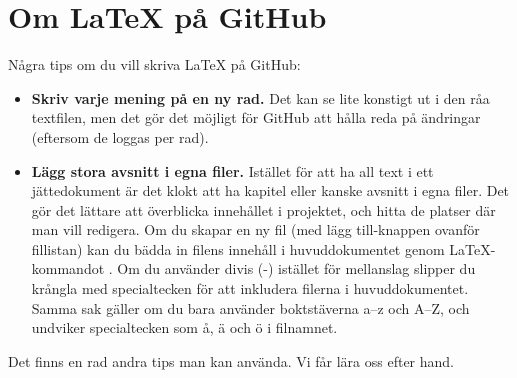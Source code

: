 \section{Om LaTeX på GitHub}

Några tips om du vill skriva LaTeX på GitHub:

\begin{itemize}

\item \textbf{Skriv varje mening på en ny rad.}
Det kan se lite konstigt ut i den råa textfilen, men det gör det möjligt för GitHub att hålla reda på ändringar (eftersom de loggas per rad).
\item \textbf{Lägg stora avsnitt i egna filer.}
Istället för att ha all text i ett jättedokument är det klokt att ha kapitel eller kanske avsnitt i egna filer.
Det gör det lättare att överblicka innehållet i projektet, och hitta de platser där man vill redigera.
Om du skapar en ny fil (med lägg till-knappen ovanför fillistan) kan du bädda in filens innehåll i huvuddokumentet genom LaTeX-kommandot \verbose{}.
Om du använder divis (-) istället för mellanslag slipper du krångla med specialtecken för att inkludera filerna i huvuddokumentet.
Samma sak gäller om du bara använder boktstäverna a--z och A--Z, och undviker specialtecken som å, ä och ö i filnamnet.

\end{itemize}

Det finns en rad andra tips man kan använda. Vi får lära oss efter hand.
